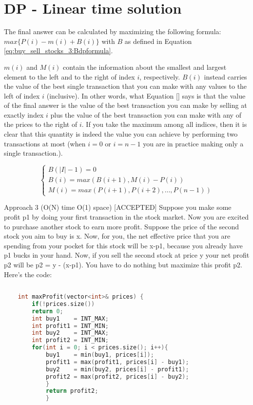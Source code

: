\section{DP - Linear time solution}
\label{buy_sell_stocks_3:sec:linear}
The final answer can be calculated by maximizing the following formula: $max\{P(i)-m(i) + B(i)\}$ with $B$ as defined in Equation \ref{eq:buy_sell_stocks_3:Bdpformula}.

$m(i)$ and $M(i)$ contain the information about the smallest and largest element to the left and to the right of index $i$, respectively.
$B(i)$ instead carries the value of the best single transaction that you can make with any values to the left of index $i$ (inclusive).
In other words, what Equation \ref{} says is that the value of the final answer is the value of the best transaction you can make by selling at exactly index $i$ plus the value of the best transaction you can make with any of the prices to the right of $i$.
If you take the maximum among all indices, then it is clear that this quantity is indeed the value you can achieve by performing two transactions at most (when $i=0$ or $i=n-1$ you are in practice making only a single transaction.).

\begin{equation}
    \begin{cases}
        B(|I|-1) = 0 \\
        B(i) = max(B(i+1), M(i)-P(i)) \\
		M(i) = max(P(i+1), P(i+2), \ldots, P(n-1))
     \end{cases}
    \label{eq:buy_sell_stocks_3:Bdpformula}
\end{equation}





Approach 3 (O(N) time O(1) space) [ACCEPTED]
Suppose you make some profit p1 by doing your first transaction in the stock market. Now you are excited to purchase another stock to earn more profit. Suppose the price of the second stock you aim to buy is x. Now, for you, the net effective price that you are spending from your pocket for this stock will be x-p1, because you already have p1 bucks in your hand. Now, if you sell the second stock at price y your net profit p2 will be p2 = y - (x-p1). You have to do nothing but maximize this profit p2. Here's the code:
\begin{lstlisting}[language=c++,numbers=none, caption={}]
	      
	int maxProfit(vector<int>& prices) {
		if(!prices.size())
		return 0;
        int buy1    = INT_MAX;
        int profit1 = INT_MIN;
        int buy2    = INT_MAX;
        int profit2 = INT_MIN;
        for(int i = 0; i < prices.size(); i++){
			buy1    = min(buy1, prices[i]);
            profit1 = max(profit1, prices[i] - buy1);
            buy2    = min(buy2, prices[i] - profit1);
            profit2 = max(profit2, prices[i] - buy2);
			}
			return profit2;
			}
		\end{lstlisting} 